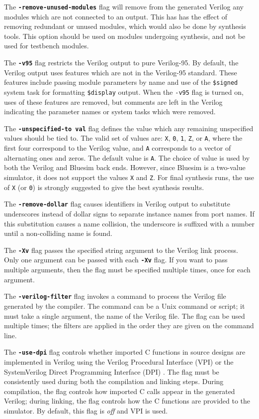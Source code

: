\documentclass{article}
\begin{document}
The {\bf\tt -remove-unused-modules} flag will remove from the generated
Verilog any modules which are not connected to an
output.  This has has the effect of removing redundant or unused
modules, which would also be done by synthesis tools.   This option
should be used on modules undergoing synthesis, and not be used for
testbench modules.

The {\bf\tt -v95} flag restricts the Verilog output to pure Verilog-95.
By default, the Verilog output uses features which are not in the
Verilog-95 standard.  These features include passing module
parameters by name and use of the {\tt \$signed} system task for formatting
{\tt \$display} output.  When the {\tt -v95} flag is turned on, uses
of these features are removed, but comments are left in the Verilog
indicating the parameter names or system tasks which were removed.

The {\bf\tt -unspecified-to val} flag defines the value
which any remaining unspecified values should be tied to.  The valid
set of values are: {\tt X}, {\tt 0}, {\tt 1}, {\tt Z}, or {\tt A},
where the first four correspond to the Verilog value, and {\tt A}
corresponds to a vector of alternating ones and zeros.
The default value is {\tt A}.  The choice of value is used by both
the Verilog and Bluesim back ends.  However, since Bluesim is a two-value
simulator, it does not support the values {\tt X} and {\tt Z}.
For final synthesis runs, the use of {\tt X} (or {\tt 0})
is strongly suggested to give the best synthesis results.

The {\bf\tt -remove-dollar} flag causes identifiers in Verilog output
to substitute underscores instead of dollar signs to separate instance
names from port names.  If this substitution causes a name collision,
the underscore is suffixed with a number until a non-colliding name is
found.

The {\bf\tt -Xv} flag passes the specified string argument to the Verilog link
process.   Only one argument can be passed with each {\bf\tt -Xv}
flag. If you want to pass multiple arguments, then the flag must be
specified multiple times, once for each argument.

The {\bf\tt -verilog-filter} flag invokes a command to process the
 Verilog file generated by the compiler.  The command can be a Unix
 command or script;
it must take a single argument, the name of the Verilog file.    The
 flag can be used multiple times; the filters are applied in the order
 they are given on the command line.

The {\bf\tt -use-dpi} flag controls whether imported C functions in
source designs are implemented in Verilog using
the Verilog Procedural Interface (VPI)
or the SystemVerilog Direct Programming Interface (DPI)
.
The flag must be consistently used during both the compilation and
linking steps.
During compilation, the flag controls how imported C calls appear
in the generated Verilog;
during linking, the flag controls how the C functions are provided
to the simulator.
By default, this flag is \emph{off} and VPI is used.
\end{document}
